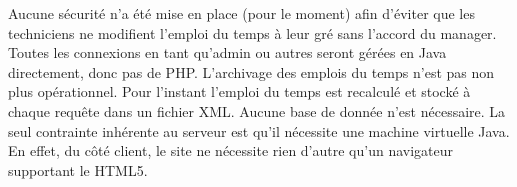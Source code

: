 Aucune sécurité n'a été mise en place (pour le moment) afin d'éviter que les techniciens ne modifient l'emploi du temps à leur gré sans l'accord du manager.
Toutes les connexions en tant qu'admin ou autres seront gérées en Java directement, donc pas de PHP.
L'archivage des emplois du temps n'est pas non plus opérationnel. Pour l'instant l'emploi du temps est recalculé et stocké à chaque requête  dans un fichier XML. Aucune base de donnée n'est nécessaire.
La seul contrainte inhérente au serveur est qu'il nécessite une machine virtuelle Java.
En effet, du côté client, le site ne nécessite rien d'autre qu'un navigateur supportant le HTML5. 
